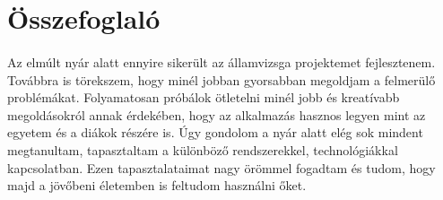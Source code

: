 \documentclass{article}
\begin{document}
	\newpage
	
	\section{Összefoglaló}
	\paragraph{}
	Az elmúlt nyár alatt ennyire sikerült az államvizsga projektemet fejlesztenem. Továbbra is törekszem, hogy minél jobban gyorsabban megoldjam a felmerülő problémákat. Folyamatosan próbálok ötletelni minél jobb és kreatívabb megoldásokról annak érdekében, hogy az alkalmazás hasznos legyen mint az egyetem és a diákok részére is. Úgy gondolom a nyár alatt elég sok mindent megtanultam, tapasztaltam a különböző rendszerekkel, technológiákkal kapcsolatban. Ezen tapasztalataimat nagy örömmel fogadtam és tudom, hogy majd a jövőbeni életemben is feltudom használni őket.
	
	\newpage
	
	
		 
	
\end{document}
